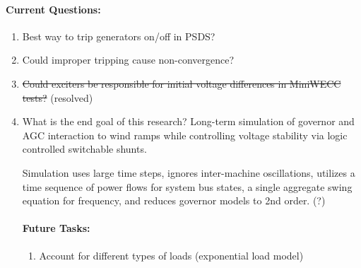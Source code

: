 \documentclass[12pt]{article}
\begin{document}
\begin{multicols}{2}
	\paragraph{Current Questions:}
	\begin{enumerate}
	
	\item Best way to trip generators on/off in PSDS?
	\item Could improper tripping cause non-convergence?
	
	\item \sout{Could exciters be responsible for initial voltage differences in MiniWECC tests?} (resolved)

	\item What is the end goal of this research?
	\subitem Long-term simulation of governor and AGC interaction to wind ramps while controlling voltage stability via logic controlled switchable shunts.
	
	 Simulation uses large time steps, ignores inter-machine oscillations, utilizes a time sequence of power flows for system bus states, a single aggregate swing equation for frequency, and reduces governor models to 2nd order. (?)
	
		



\vfill\null
\columnbreak

\paragraph{Future Tasks:} %
	\begin{enumerate}

		\item Account for different types of loads (exponential load model)
		

\end{enumerate}
\end{enumerate}
\end{multicols}
\end{document}
